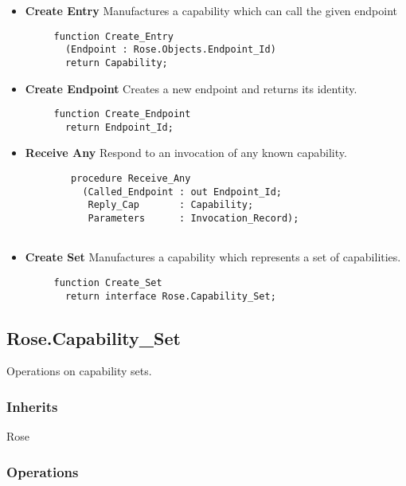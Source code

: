 \begin{itemize}
    \item \textbf{Create Entry} Manufactures a capability which can call the given endpoint
    
    \begin{verbatim}
     function Create_Entry 
       (Endpoint : Rose.Objects.Endpoint_Id) 
       return Capability;    
    \end{verbatim}
    
    \item \textbf{Create Endpoint} Creates a new endpoint and returns its identity.
    
    \begin{verbatim}
     function Create_Endpoint
       return Endpoint_Id;    
    \end{verbatim}
    
    \item \textbf{Receive Any} Respond to an invocation of any known capability.
    
    \begin{verbatim}
        procedure Receive_Any
          (Called_Endpoint : out Endpoint_Id;
           Reply_Cap       : Capability;
           Parameters      : Invocation_Record);
           
    \end{verbatim}

    \item \textbf{Create Set} Manufactures a capability which represents a set of capabilities.
    
    \begin{verbatim}
     function Create_Set
       return interface Rose.Capability_Set;    
    \end{verbatim}
    
\end{itemize}

\subsection{Rose.Capability\_Set}

Operations on capability sets.

\subsubsection{Inherits}

Rose

\subsubsection{Operations}

